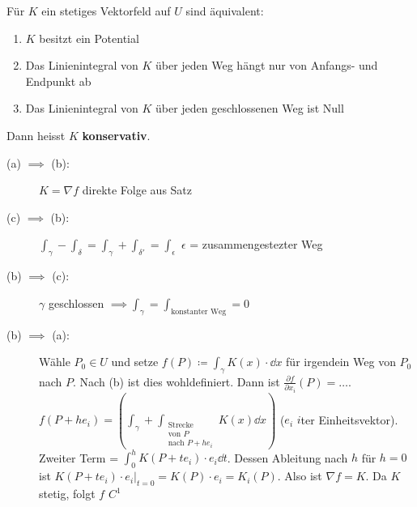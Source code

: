 \begin{satz*}
	Für $K$ ein stetiges Vektorfeld auf $U$ sind äquivalent:
	\begin{enumerate}[label = (\alph*)]
		\item $K$ besitzt ein Potential
		\item Das Linienintegral von $K$ über jeden Weg hängt nur von Anfangs- und Endpunkt ab
		\item Das Linienintegral von $K$ über jeden geschlossenen Weg ist Null
	\end{enumerate}
	\begin{def*}[note = konservativ , index = konservativ]
		Dann heisst $K$ \textbf{konservativ}.
	\end{def*}
	\begin{bew}
		\begin{description}
			\item[(a) $\implies$ (b):] $K = \nabla f$ direkte Folge aus Satz
			\item[(c) $\implies$ (b):] $\int_{\gamma} - \int_{\delta} = \int_{\gamma} + \int_{\delta'} = \int_{\epsilon}$ $\epsilon$ = zusammengestezter Weg
			\item[(b) $\implies$ (c):] $\gamma$ geschlossen $\implies \int_{\gamma} = \int_{\text{konstanter Weg}} = 0$
			\item[(b) $\implies$ (a):] Wähle $P_0 \in U$ und setze $f(P) \coloneqq \int_{\gamma} K(x) \cdot \dd x$ für irgendein Weg von $P_0$ nach $P$. Nach (b) ist dies wohldefiniert. Dann ist $\frac{\partial f}{\partial x_i}(P) = \dots$. $f(P + h e_i) = \left( \int_{\gamma} + \int_{\substack{\text{Strecke}\\\text{von $P$}\\\text{nach } P+he_i}} K(x) \dd x \right)$ ($e_i$ $i$ter Einheitsvektor). Zweiter Term = $\int_0^h K(P + te_i) \cdot e_i \dd t$. Dessen Ableitung nach $h$ für $h = 0$ ist $K(P + te_i) \cdot e_i |_{t = 0} = K(P) \cdot e_i = K_i(P)$. Also ist $\nabla f = K$. Da $K$ stetig, folgt $f$ $C^1$
		\end{description}
	\end{bew}
\end{satz*}
